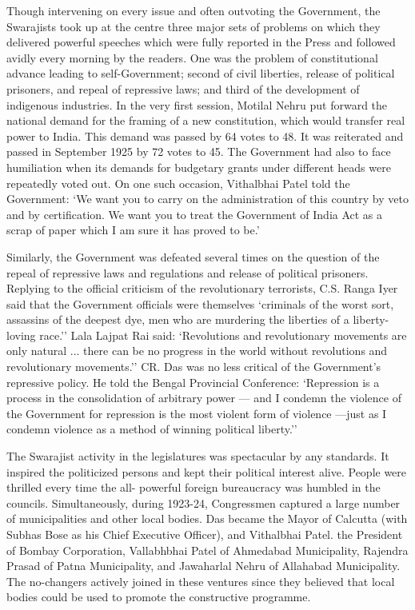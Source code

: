 Though intervening on every issue and often outvoting the Government, the Swarajists took up at the centre three major sets of problems on which they delivered powerful speeches which were fully reported in the Press and followed avidly every morning by the readers. One was the problem of constitutional advance leading to self-Government; second of civil liberties, release of political prisoners, and repeal of repressive laws; and third of the development of indigenous industries. In the very first session, Motilal Nehru put forward the national demand for the framing of a new constitution, which would transfer real power to India. This demand was passed by 64 votes to 48. It was reiterated and passed in September 1925 by 72 votes to 45. The Government had also to face humiliation when its demands for budgetary grants under different heads were repeatedly voted out. On one such occasion, Vithalbhai Patel told the Government: `We want you to carry on the administration of this country by veto and by certification. We want you to treat the Government of India Act as a scrap of paper which I am sure it has proved to be.'

Similarly, the Government was defeated several times on the question of the repeal of repressive laws and regulations and release of political prisoners. Replying to the official criticism of the revolutionary terrorists, C.S. Ranga Iyer said that the Government officials were themselves `criminals of the worst sort, assassins of the deepest dye, men who are murdering the liberties of a liberty-loving race.'' Lala Lajpat Rai said: `Revolutions and revolutionary movements are only natural ... there can be no progress in the world without revolutions and revolutionary movements.'' CR. Das was no less critical of the Government's repressive policy. He told the Bengal Provincial Conference: `Repression is a process in the consolidation of arbitrary power — and I condemn the violence of the Government for repression is the most violent form of violence —just as I condemn violence as a method of winning political liberty.''

The Swarajist activity in the legislatures was spectacular by any standards. It inspired the politicized persons and kept their political interest alive. People were thrilled every time the all- powerful foreign bureaucracy was humbled in the councils. Simultaneously, during 1923-24, Congressmen captured a large number of municipalities and other local bodies. Das became the Mayor of Calcutta (with Subhas Bose as his Chief Executive Officer), and Vithalbhai Patel. the President of Bombay Corporation, Vallabhbhai Patel of Ahmedabad Municipality, Rajendra Prasad of Patna Municipality, and Jawaharlal Nehru of Allahabad Municipality. The no-changers actively joined in these ventures since they believed that local bodies could be used to promote the constructive programme.

